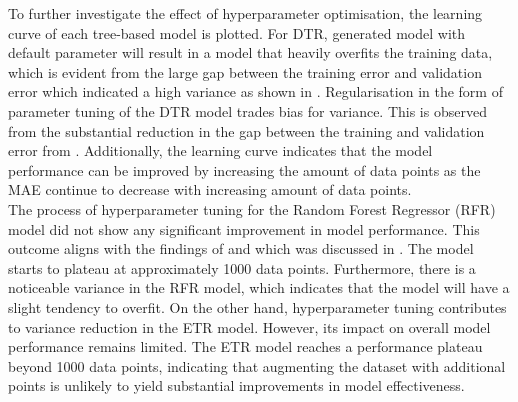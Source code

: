 To further investigate the effect of hyperparameter optimisation, the learning curve of each tree-based model is plotted. For DTR, generated model with default parameter will result in a model that heavily overfits the training data, which is evident from the large gap between the training error and validation error which indicated a high variance as shown in . Regularisation in the form of parameter tuning of the DTR model trades bias for variance. This is observed from the substantial reduction in the gap between the training and validation error from . Additionally, the learning curve indicates that the model performance can be improved by increasing the amount of data points as the MAE continue to decrease with increasing amount of data points.\\

The process of hyperparameter tuning for the Random Forest Regressor (RFR) model did not show any significant improvement in model performance. This outcome aligns with the findings of   and  which was discussed in . The model starts to plateau at approximately 1000 data points. Furthermore, there is a noticeable variance in the RFR model, which indicates that the model will have a slight tendency to overfit. On the other hand, hyperparameter tuning contributes to variance reduction in the ETR model. However, its impact on overall model performance remains limited. The ETR model reaches a performance plateau beyond 1000 data points, indicating that augmenting the dataset with additional points is unlikely to yield substantial improvements in model effectiveness.\\


